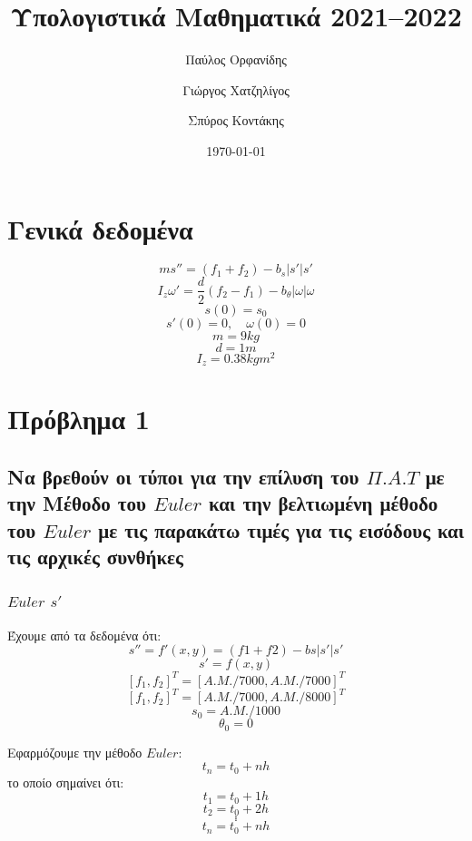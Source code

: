 \documentclass[a4paper]{article}
\author{Παύλος Ορφανίδης \and Γιώργος Χατζηλίγος \and Σπύρος Κοντάκης}
\date{\today}
\title{Υπολογιστικά Μαθηματικά 2021--2022}
\begin{document}
    \maketitle
    \tableofcontents
    \section*{Γενικά δεδομένα}
        \begin{equation}
            ms'' = (f_1+f_2)-b_s\rvert s' \lvert s'
        \end{equation}
        \begin{equation}
            I_z\omega '=\frac{d}{2}(f_2-f_1)-b_{\theta}\rvert\omega\lvert\omega
        \end{equation}
        \begin{equation}
            s(0)=s_0
        \end{equation}
        \begin{equation}
            s'(0)=0,\quad \omega(0)=0
        \end{equation}
        \[m=9kg\]
        \[d=1m\]
        \[I_z=0.38 kgm^2\]
    \section{Πρόβλημα 1}
        \subsection{Nα βρεθούν οι τύποι για την επίλυση του $\Pi.A.T$ με την Mέθοδο του $Euler$ και την βελτιωμένη μέθοδο του $Euler$ με τις παρακάτω τιμές για τις εισόδους και τις αρχικές συνθήκες}
        \subsubsection*{$Euler$ $s'$}
        Έχουμε από τα δεδομένα ότι:
        \begin{equation}
            s''=f'(x,y)=(f1+f2)-bs|s'|s'
        \end{equation}
        \begin{equation}
            s'=f(x,y)
        \end{equation}
        \[{[f_1,f_2]}^T={[A.M./7000, A.M./7000]}^T\]
        \[{[f_1,f_2]}^T={[A.M./7000, A.M./8000]}^T\]
        \[s_0=A.M./1000\]
        \[\theta_0=0\]

        Εφαρμόζουμε την μέθοδο $Euler$:
        \[t_n=t_0+nh\]
        το οποίο σημαίνει ότι:
        \[t_1=t_0+1h\]
        \[t_2=t_0+2h\]
        \[.\]
        \[.\]
        \[.\]
        \[t_n=t_0+nh\]
\end{document}
